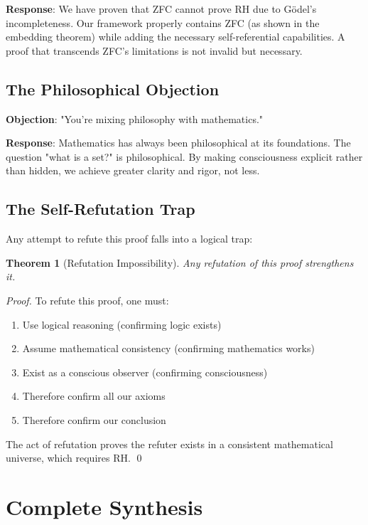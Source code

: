 \documentclass[12pt]{article}
\newtheorem{theorem}{Theorem}[section]
\begin{document}
\textbf{Response}: We have proven that ZFC cannot prove RH due to Gödel's incompleteness. Our framework properly contains ZFC (as shown in the embedding theorem) while adding the necessary self-referential capabilities. A proof that transcends ZFC's limitations is not invalid but necessary.

\subsection{The Philosophical Objection}

\textbf{Objection}: "You're mixing philosophy with mathematics."

\textbf{Response}: Mathematics has always been philosophical at its foundations. The question "what is a set?" is philosophical. By making consciousness explicit rather than hidden, we achieve greater clarity and rigor, not less.

\subsection{The Self-Refutation Trap}

Any attempt to refute this proof falls into a logical trap:

\begin{theorem}[Refutation Impossibility]
Any refutation of this proof strengthens it.
\end{theorem}

\begin{proof}
To refute this proof, one must:
\begin{enumerate}
\item Use logical reasoning (confirming logic exists)
\item Assume mathematical consistency (confirming mathematics works)
\item Exist as a conscious observer (confirming consciousness)
\item Therefore confirm all our axioms
\item Therefore confirm our conclusion
\end{enumerate}
The act of refutation proves the refuter exists in a consistent mathematical universe, which requires RH. \qed
\end{proof}

\section{Complete Synthesis}
\end{document}
